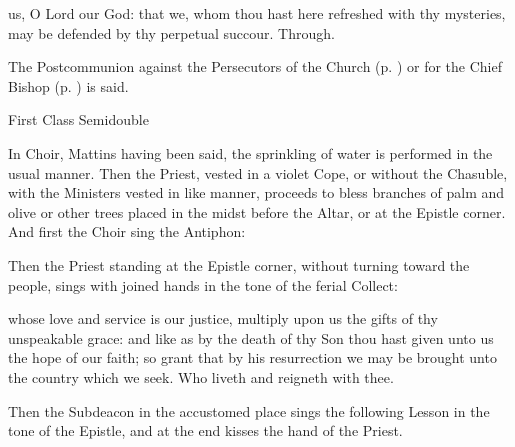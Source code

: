  us, O Lord our God: that we, whom thou hast here refreshed with thy mysteries, may be defended by thy perpetual succour. Through.
\begin{rubric}
    The Postcommunion against the Persecutors of the Church (p. \pageref{SPAgainst}) or for the Chief Bishop (p. \pageref{SPChiefBishop}) is said.
\end{rubric}

\label{PalmSunday}
\begin{inhead}
{First Class Semidouble}
\end{inhead}

\begin{rubric}
In Choir, Mattins having been said, the sprinkling of water is performed in the usual manner. Then the Priest, vested in a violet Cope, or without the Chasuble, with the Ministers vested in like manner, proceeds to bless branches of palm and olive or other trees placed in the midst before the Altar, or at the Epistle corner. And first the Choir sing the Antiphon:
\end{rubric}
\begin{rubric}
    Then the Priest standing at the Epistle corner, without turning toward the people, sings with joined hands in the tone of the ferial Collect:
\end{rubric}
{} whose love and service is our justice, multiply upon us the gifts of thy unspeakable grace: and like as by the death of thy Son thou hast given unto us the hope of our faith; so grant that by his resurrection we may be brought unto the country which we seek. Who liveth and reigneth with thee.
\begin{rubric}
    Then the Subdeacon in the accustomed place sings the following Lesson in the tone of the Epistle, and at the end kisses the hand of the Priest.
\end{rubric}
